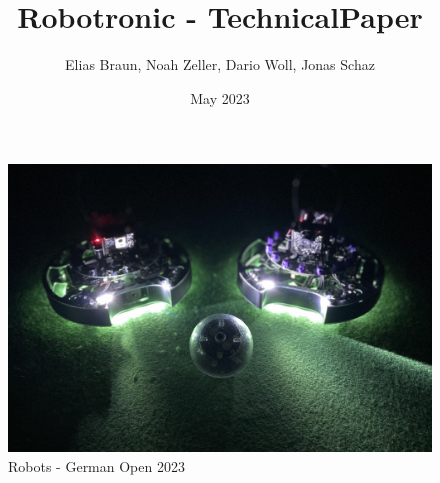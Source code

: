 \documentclass{scrartcl}
\title{Robotronic - TechnicalPaper}
\author{Elias Braun, Noah Zeller, Dario Woll, Jonas Schaz}
\date{May 2023}
\begin{document}
\maketitle

\begin{figure}[h]
    \centering
    \includegraphics[width=\textwidth]{img/Robotronic-Robots.JPEG}
    \caption{Robots - German Open 2023}
    \label{fig:robots}
\end{figure}
\newpage

\tableofcontents
\newpage








\end{document}
